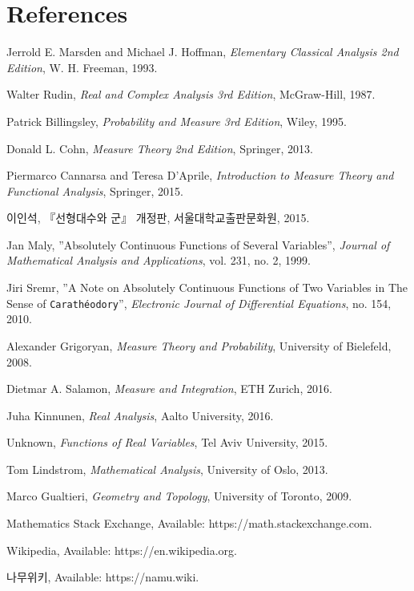 \section*{References}
\normalsize\ttfamily
\begin{enumerate}[label = {[\arabic*]}]
    \item Jerrold E. Marsden and Michael J. Hoffman, \textit{Elementary Classical Analysis 2nd Edition}, W. H. Freeman, 1993.
    \item Walter Rudin, \textit{Real and Complex Analysis 3rd Edition}, McGraw-Hill, 1987.
    \item Patrick Billingsley, \textit{Probability and Measure 3rd Edition}, Wiley, 1995.
    \item Donald L. Cohn, \textit{Measure Theory 2nd Edition}, Springer, 2013.
    \item Piermarco Cannarsa and Teresa D'Aprile, \textit{Introduction to Measure Theory and Functional Analysis}, Springer, 2015.
    \item \textrm{이인석}, \textrm{『선형대수와 군』 개정판}, \textrm{서울대학교출판문화원}, 2015.
    \item Jan Maly, ''Absolutely Continuous Functions of Several Variables'', \textit{Journal of Mathematical Analysis and Applications}, vol. 231, no. 2, 1999.
    \item Jiri Sremr, ''A Note on Absolutely Continuous Functions of Two Variables in The Sense of \texttt{Carath\'eodory}'', \textit{Electronic Journal of Differential Equations}, no. 154, 2010.
    \item Alexander Grigoryan, \textit{Measure Theory and Probability}, University of Bielefeld, 2008.
    \item Dietmar A. Salamon, \textit{Measure and Integration}, ETH Zurich, 2016.
    \item Juha Kinnunen, \textit{Real Analysis}, Aalto University, 2016.
    \item Unknown, \textit{Functions of Real Variables}, Tel Aviv University, 2015.
    \item Tom Lindstrom, \textit{Mathematical Analysis}, University of Oslo, 2013.
    \item Marco Gualtieri, \textit{Geometry and Topology}, University of Toronto, 2009.
    \item Mathematics Stack Exchange, Available: https://math.stackexchange.com.
    \item Wikipedia, Available: https://en.wikipedia.org.
    \item \textrm{나무위키}, Available: https://namu.wiki.
\end{enumerate}
\rmfamily